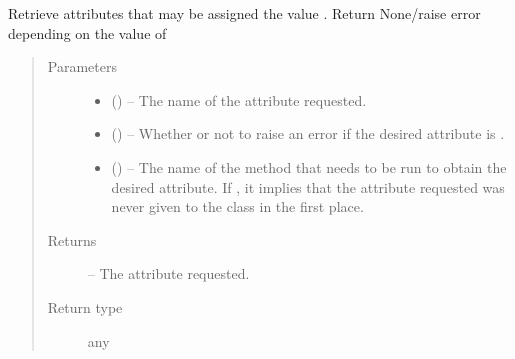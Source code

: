 \documentclass[letterpaper,10pt,english]{sphinxmanual}
\begin{document}
\begin{fulllineitems}
\begin{fulllineitems}
\label{\detokenize{references/core:nmrespy.core.Estimator._check_if_none}}
\sphinxAtStartPar
Retrieve attributes that may be assigned the value . Return
None/raise error depending on the value of 
\begin{quote}\begin{description}
\item[{Parameters}] \leavevmode\begin{itemize}
\item {} 
\sphinxAtStartPar
{} () – The name of the attribute requested.

\item {} 
\sphinxAtStartPar
{} () – Whether or not to raise an error if the desired attribute is
.

\item {} 
\sphinxAtStartPar
{} (\sphinxstyleliteralemphasis{\sphinxupquote{, }}) – The name of the method that needs to be run to obtain the
desired attribute. If , it implies that the attribute
requested was never given to the class in the first place.

\end{itemize}

\item[{Returns}] \leavevmode
\sphinxAtStartPar
{} – The attribute requested.

\item[{Return type}] \leavevmode
\sphinxAtStartPar
any

\end{description}\end{quote}

\end{fulllineitems}



\end{fulllineitems}
\end{document}
